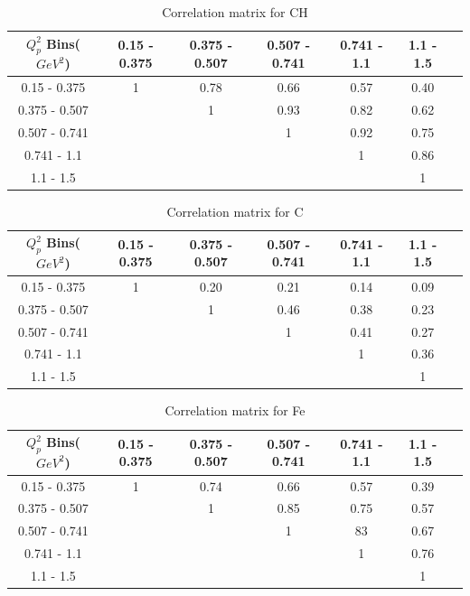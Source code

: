 \begin{table}[ht]
\begin{tabular}{c | c c c c c c | }
\hline
\hline
$Q^2_p$ Bins($GeV^2$)&0.15 - 0.375&0.375 - 0.507&0.507 - 0.741&0.741 - 1.1&1.1 - 1.5\\
\hline
0.15 - 0.375 & 1 & 0.78 & 0.66 & 0.57 & 0.40\\ 
0.375 - 0.507 & & 1 & 0.93 & 0.82 & 0.62 \\ 
0.507 - 0.741 & & & 1 & 0.92 & 0.75 \\ 
0.741 - 1.1 & & & &  1 & 0.86 \\ 
1.1 - 1.5 & & & & &  1  \\ 
\hline
\hline
\end{tabular}
\caption{Correlation matrix for CH}
\end{table}

\begin{table}[ht]
\begin{tabular}{c | c c c c c c | }
\hline
\hline
$Q^2_p$ Bins($GeV^2$)&0.15 - 0.375&0.375 - 0.507&0.507 - 0.741&0.741 - 1.1&1.1 - 1.5\\
\hline
0.15 - 0.375 & 1 & 0.20 & 0.21 & 0.14 & 0.09\\
0.375 - 0.507 & & 1 & 0.46 & 0.38 & 0.23 \\
0.507 - 0.741 & & & 1 & 0.41 & 0.27 \\
0.741 - 1.1 & & & &  1 & 0.36 \\
1.1 - 1.5 & & & & &  1  \\
\hline
\hline
\end{tabular}
\caption{Correlation matrix for C}
\end{table}

\begin{table}[ht]
\begin{tabular}{c | c c c c c c | }
\hline
\hline
$Q^2_p$ Bins($GeV^2$)&0.15 - 0.375&0.375 - 0.507&0.507 - 0.741&0.741 - 1.1&1.1 - 1.5\\
\hline
0.15 - 0.375 & 1 & 0.74 & 0.66 & 0.57 & 0.39\\
0.375 - 0.507 & & 1 & 0.85 & 0.75 & 0.57 \\
0.507 - 0.741 & & & 1 & 83 & 0.67 \\
0.741 - 1.1 & & & &  1 & 0.76 \\
1.1 - 1.5 & & & & &  1  \\
\hline
\hline
\end{tabular}
\caption{Correlation matrix for Fe}
\end{table}

